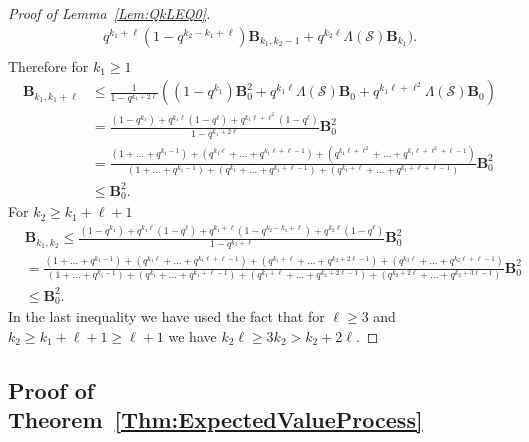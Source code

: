 \documentclass[letterpaper,11pt]{article}
\theoremstyle{definition}
\theoremstyle{remark}
\renewcommand{\le}{\leqslant}
\renewcommand{\ge}{\geqslant}
\newcommand{\productO}{\Lambda(\cS)}
\newcommand{\bB}{\mathbf{B}}
\newcommand{\cS}{\mathcal{S}}
\begin{document}
\begin{proof}[Proof of Lemma~\ref{Lem:QkLEQ0}]
\begin{align*}
		q^{k_1+\ell}(1-q^{k_2-k_1+\ell})\bB_{k_1,k_2-1}
		+q^{k_2\ell}\productO\bB_{k_1}
		\Big).\\
	\end{align*} 
	Therefore for $k_1\ge 1$
	\begin{align*}
		\bB_{k_1,k_1+\ell}&\le \frac{1}{1-q^{k_1+2\ell}}\left((1-q^{k_1})\bB_{0}^2+q^{k_1\ell}\productO\bB_{0}+q^{k_1\ell+\ell^2}\productO\bB_{0}\right)\\
		&=\frac{(1-q^{k_1})+q^{k_1\ell}(1-q^\ell)+q^{k_1\ell+\ell^2}(1-q^\ell)}{1-q^{k_1+2\ell}}\bB_{0}^2\\
		&=\frac{(1+\ldots+q^{k_1-1})+(q^{k_1\ell}+\ldots+q^{k_1\ell+\ell-1})+(q^{k_1\ell+\ell^2}+\ldots+q^{k_1\ell+\ell^2+\ell-1})}
		{(1+\ldots+q^{k_1-1})+(q^{k_1}+\ldots+q^{k_1+\ell-1})+(q^{k_1+\ell}+\ldots+q^{k_1+\ell+\ell-1})}\bB_{0}^2\\
		&\le \bB_{0}^2.
	\end{align*}
	For $k_2\ge k_1+\ell+1$ 
	\begin{align*}
		&\bB_{k_1,k_2}\le \frac{(1-q^{k_1})+q^{k_1\ell}(1-q^\ell)+q^{k_1+\ell}(1-q^{k_2-k_1+\ell})+q^{k_2\ell}(1-q^\ell)}{1-q^{k_2+\ell}}\bB_{0}^2\\
		&=\frac{
			(1+\ldots+q^{k_1-1})
			+(q^{k_1\ell}+\ldots+q^{k_1\ell+\ell-1})
			+(q^{k_1+\ell}+\ldots+q^{k_2+2\ell-1})
			+(q^{k_2\ell}+\ldots+q^{k_2\ell+\ell-1})}
		{(1+\ldots+q^{k_1-1})
			+(q^{k_1}+\ldots+q^{k_1+\ell-1})
			+(q^{k_1+\ell}+\ldots+q^{k_2+2\ell-1})
			+(q^{k_2+2\ell}+\ldots+q^{k_2+3\ell-1})}\bB_{0}^2\\
		&\le \bB_{0}^2.
	\end{align*}
	In the last inequality we have used the fact that for $\ell\ge 3$ and $k_2\ge k_1+\ell+1\ge \ell+1$ we have $k_2\ell\ge 3k_2> k_2+2\ell$.
\end{proof}



\subsection{Proof of Theorem~\ref{Thm:ExpectedValueProcess}}
\end{document}

